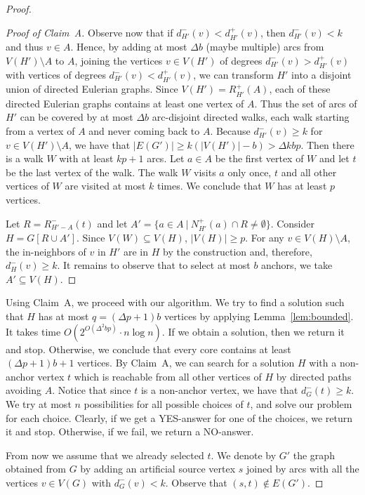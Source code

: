 \documentclass[11pt,a4paper]{article}
\begin{document}
\begin{proof}
\begin{proof}[Proof of Claim~A]
Observe now that if $d_{H'}^-(v)<d_{H'}^+(v)$, then $d_{H'}^-(v)<k$ and thus $v\in A$. Hence, by adding at most $\Delta b$
(maybe multiple) arcs from $V(H')\setminus A$ to $A$, joining the vertices $v\in V(H')$ of degrees $d_{H'}^-(v)>d_{H'}^+(v)$ with
vertices of degrees  $d_{H'}^-(v)<d_{H'}^+(v)$, we  can  transform $H'$ into a disjoint union of  directed Eulerian graphs.
Since $V(H')=R_{H'}^+(A)$, each of these directed Eulerian graphs contains at least one vertex of $A$. Thus  the set of arcs
of $H'$ can be covered by at most $\Delta b$ arc-disjoint directed walks,   each walk starting from a vertex of $A$ and never
coming back to $A$. Because $d_{H'}^-(v)\geq k$ for $v\in V(H')\setminus A$, we have that $|E(G')|\geq k(|V(H')|-b)> \Delta
kbp$. Then there is a walk $W$ with at least $kp+1$ arcs.  Let $a\in A$ be the first vertex of $W$ and let $t$ be the last
vertex of the walk. The walk $W$ visits $a$ only once, $t$  and all other vertices of $W$ are visited at most $k$ times. We
conclude  that $W$ has at least $p$ vertices.

Let $R=R_{H'-A}^-(t)$ and let $A'=\{a\in A\ |\ N_{H'}^+(a)\cap R\neq\emptyset\}$. Consider $H=G[R\cup A']$. Since
$V(W)\subseteq V(H)$, $|V(H)|\geq p$.  For any $v\in V(H)\setminus A$, the in-neighbors of $v$ in $H'$ are in $H$ by the
construction and, therefore, $d_H^-(v)\geq k$. It remains to observe that to select at most $b$ anchors, we take $A'\subseteq
V(H)$.
\end{proof}

Using  Claim~A, we proceed with our algorithm. We try to find a solution such that $H$ has at most $q=(\Delta
p+1)b$ vertices by applying  Lemma~\ref{lem:bounded}. It takes time $O(2^{O(\Delta^2 bp)}\cdot n\log n)$. If we obtain a
solution, then we return it and stop. Otherwise, we conclude that every core  contains at least $(\Delta p+1)b+1$
vertices. By Claim~A, we can search for a solution   $H$ with a  non-anchor vertex $t$ which is reachable from
all other vertices of $H$ by directed paths  avoiding $A$. Notice that since $t$ is a non-anchor vertex, we have that
$d_G^-(t)\geq k$. We try  at most $n$ possibilities for all possible choices of  $t$, and solve our problem for each choice.
Clearly, if we get a YES-answer for one of the choices, we return it and stop. Otherwise, if we fail,  we return a NO-answer.

From now we assume that we already selected $t$. We denote by $G'$ the graph obtained from $G$ by adding  an artificial source
vertex $s$ joined by arcs with all the vertices $v\in V(G)$ with $d_G^-(v)<k$. Observe that $(s,t)\notin E(G')$.


\end{proof}
\end{document}
